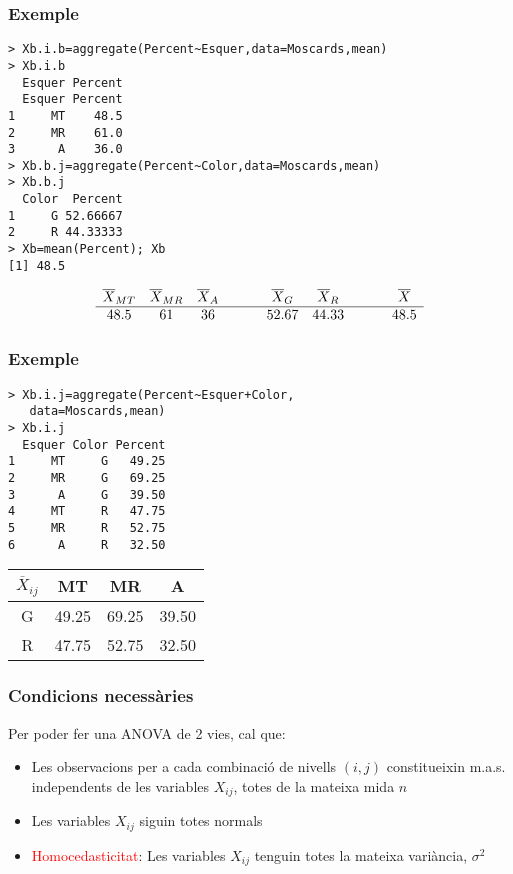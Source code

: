 \documentclass[12pt,t]{beamer}
\newcommand{\red}[1]{\textcolor{red}{#1}}
\theoremstyle{plain}
\theoremstyle{definition}
\begin{document}
\begin{frame}[fragile]
\frametitle{Exemple} 

\begin{lstlisting}
> Xb.i.b=aggregate(Percent~Esquer,data=Moscards,mean)
> Xb.i.b
  Esquer Percent
  Esquer Percent
1     MT    48.5
2     MR    61.0
3      A    36.0
> Xb.b.j=aggregate(Percent~Color,data=Moscards,mean)
> Xb.b.j
  Color  Percent
1     G 52.66667
2     R 44.33333
> Xb=mean(Percent); Xb
[1] 48.5
\end{lstlisting}\vspace*{-1ex}

$$
\begin{array}{cccccccc}
\overline{X}_{MT} & \overline{X}_{MR} & \overline{X}_A & \hspace*{0.5cm} & \overline{X}_G & \overline{X}_R& \hspace*{0.5cm} & \overline{X}\\ \hline
48.5 & 61 & 36 & & 52.67 & 44.33 & & 48.5
\end{array}
$$
\end{frame}



\begin{frame}[fragile]
\frametitle{Exemple} 

\begin{lstlisting}
> Xb.i.j=aggregate(Percent~Esquer+Color,
   data=Moscards,mean)
> Xb.i.j
  Esquer Color Percent
1     MT     G   49.25
2     MR     G   69.25
3      A     G   39.50
4     MT     R   47.75
5     MR     R   52.75
6      A     R   32.50
\end{lstlisting}

\begin{center}
\begin{tabular}{c|ccc}
$\overline{X}_{ij}$ & MT & MR & A\\ \hline
G & 49.25 & 69.25 & 39.50\\
R &  47.75 & 52.75 &  32.50
\end{tabular}
\end{center}

\end{frame}





\begin{frame}
\frametitle{Condicions necessàries} 

Per poder fer una ANOVA de 2 vies, cal que:\medskip

\begin{itemize}
\item Les observacions per a cada combinació de nivells $(i,j)$ constitueixin
m.a.s. independents de les variables $X_{ij}$, totes de la mateixa  mida $n$
\medskip 

\item Les variables $X_{ij}$ siguin totes normals 
\medskip 

\item \red{Homocedasticitat}: Les variables $X_{ij}$ tenguin totes la mateixa variància,
$\sigma^2$
\end{itemize}

\end{frame}
\end{document}
